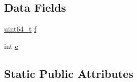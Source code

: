 \subsection*{Data Fields}
\begin{DoxyCompactItemize}
\item 
\mbox{\hyperlink{stdint_8h_aec6fcb673ff035718c238c8c9d544c47}{uint64\+\_\+t}} \mbox{\hyperlink{structrapidjson_1_1internal_1_1_diy_fp_a4d69f9f4281512c960c8bdfe9b528cdf}{f}}
\item 
int \mbox{\hyperlink{structrapidjson_1_1internal_1_1_diy_fp_adb29b66d68cb2675c06deda434bfcafb}{e}}
\end{DoxyCompactItemize}
\subsection*{Static Public Attributes}
